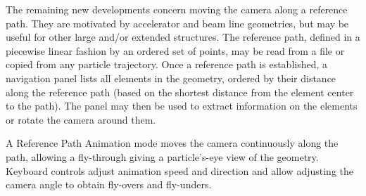 The remaining new developments concern moving the camera along a reference
path.  They are motivated by accelerator and beam line geometries, but may be
useful for other large and/or extended structures.  The reference path, defined
in a piecewise linear fashion by an ordered set of points, may be read from a 
file or copied from any particle trajectory.  Once a reference path is 
established, a navigation panel lists all elements in the geometry, ordered by
their distance along the reference path (based on the shortest distance 
\cite{vis:polyline} from the element center to the path).  The panel may then
be used to extract information on the elements or rotate the camera around them.

A Reference Path Animation mode moves the camera continuously along the path, 
allowing a fly-through giving a particle's-eye view of the geometry.  Keyboard 
controls adjust animation speed and direction and allow adjusting the camera 
angle to obtain fly-overs and fly-unders.

